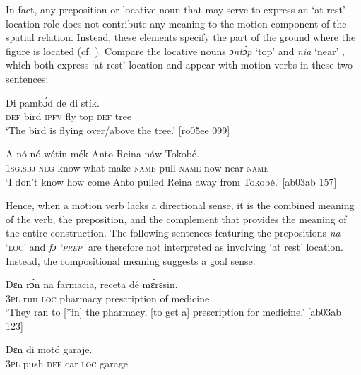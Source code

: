 In fact, any preposition or locative noun that may serve to express an ‘at rest’ location role does not contribute any meaning to the motion component of the spatial relation. Instead, these elements specify the part of the ground where the figure is located (cf. \citealt{Essegbey2005}). Compare the locative nouns \textit{ɔntɔ́p} ‘top’  and \textit{nía} ‘near’ , which both express ‘at rest’ location and appear with motion verbs in these two sentences: 



\ea%
    \label{ex:key:970}
    \gll Di  pambɔ́d  de      di  stík.\\
\textsc{def}  bird    \textsc{ipfv}  fly  top    \textsc{def}  tree\\

\glt ‘The bird is flying over/above the tree.’ [ro05ee 099]
\z


\ea%
    \label{ex:key:971}
    \gll A    nó  nó    wétin  mék    Anto  
Reina  náw        Tokobé.\\
\textsc{1sg.sbj}  \textsc{neg}  know  what  make  \textsc{name}  pull
\textsc{name}  now    near    \textsc{name}\\

\glt ‘I don’t know how come Anto pulled Reina away from Tokobé.’ [ab03ab 157]
\z

Hence, when a motion verb lacks a directional sense, it is the combined meaning of the verb, the preposition, and the complement that provides the meaning of the entire construction. The following sentences featuring the prepositions \textit{na} ‘\textsc{loc}’ and \textit{fɔ} \textit{\textup{‘}}\textit{\textsc{prep}}\textit{\textup{’}} are therefore not interpreted as involving ‘at rest’ location. Instead, the compositional meaning suggests a goal sense: 


\ea%
    \label{ex:key:972}
    \gll Dɛn    rɔ́n    na  farmacia,  receta    dé  mɛ́rɛsin.\\
\textsc{3pl}    run    \textsc{loc}  pharmacy  prescription  of  medicine\\

\glt ‘They ran to [*in] the pharmacy, [to get a] prescription for medicine.’ [ab03ab 123]
\z


\ea%
    \label{ex:key:973}
    \gll Dɛn      di  motó   garaje.\\
\textsc{3pl}  push  \textsc{def}  car    \textsc{loc}  garage\\

